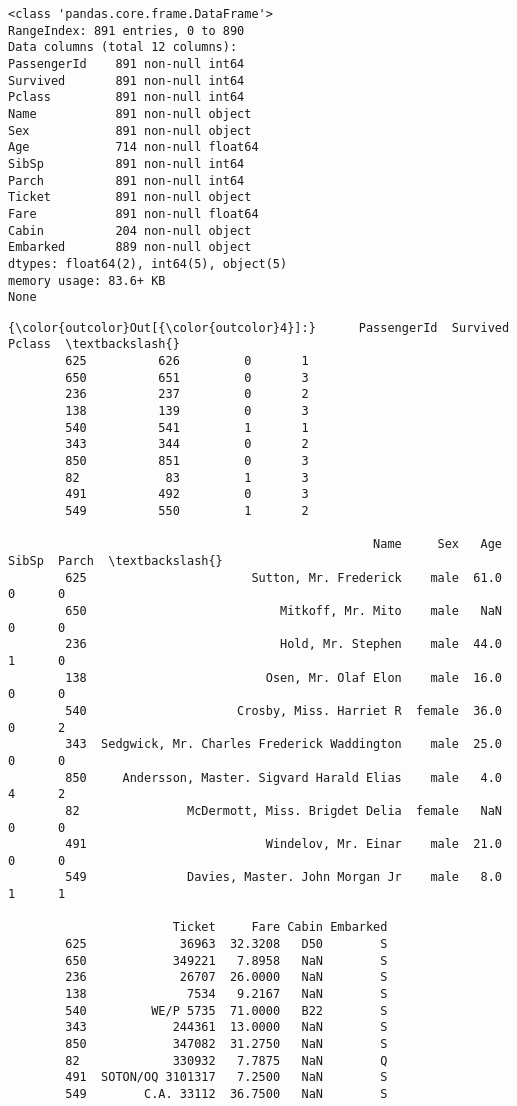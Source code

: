 \documentclass[11pt]{article}
\begin{document}
    \begin{Verbatim}[commandchars=\\\{\}]
<class 'pandas.core.frame.DataFrame'>
RangeIndex: 891 entries, 0 to 890
Data columns (total 12 columns):
PassengerId    891 non-null int64
Survived       891 non-null int64
Pclass         891 non-null int64
Name           891 non-null object
Sex            891 non-null object
Age            714 non-null float64
SibSp          891 non-null int64
Parch          891 non-null int64
Ticket         891 non-null object
Fare           891 non-null float64
Cabin          204 non-null object
Embarked       889 non-null object
dtypes: float64(2), int64(5), object(5)
memory usage: 83.6+ KB
None

    \end{Verbatim}

\begin{Verbatim}[commandchars=\\\{\}]
{\color{outcolor}Out[{\color{outcolor}4}]:}      PassengerId  Survived  Pclass  \textbackslash{}
        625          626         0       1   
        650          651         0       3   
        236          237         0       2   
        138          139         0       3   
        540          541         1       1   
        343          344         0       2   
        850          851         0       3   
        82            83         1       3   
        491          492         0       3   
        549          550         1       2   
        
                                                   Name     Sex   Age  SibSp  Parch  \textbackslash{}
        625                       Sutton, Mr. Frederick    male  61.0      0      0   
        650                           Mitkoff, Mr. Mito    male   NaN      0      0   
        236                           Hold, Mr. Stephen    male  44.0      1      0   
        138                         Osen, Mr. Olaf Elon    male  16.0      0      0   
        540                     Crosby, Miss. Harriet R  female  36.0      0      2   
        343  Sedgwick, Mr. Charles Frederick Waddington    male  25.0      0      0   
        850     Andersson, Master. Sigvard Harald Elias    male   4.0      4      2   
        82               McDermott, Miss. Brigdet Delia  female   NaN      0      0   
        491                         Windelov, Mr. Einar    male  21.0      0      0   
        549              Davies, Master. John Morgan Jr    male   8.0      1      1   
        
                       Ticket     Fare Cabin Embarked  
        625             36963  32.3208   D50        S  
        650            349221   7.8958   NaN        S  
        236             26707  26.0000   NaN        S  
        138              7534   9.2167   NaN        S  
        540         WE/P 5735  71.0000   B22        S  
        343            244361  13.0000   NaN        S  
        850            347082  31.2750   NaN        S  
        82             330932   7.7875   NaN        Q  
        491  SOTON/OQ 3101317   7.2500   NaN        S  
        549        C.A. 33112  36.7500   NaN        S  
\end{Verbatim}
            
\end{document}
